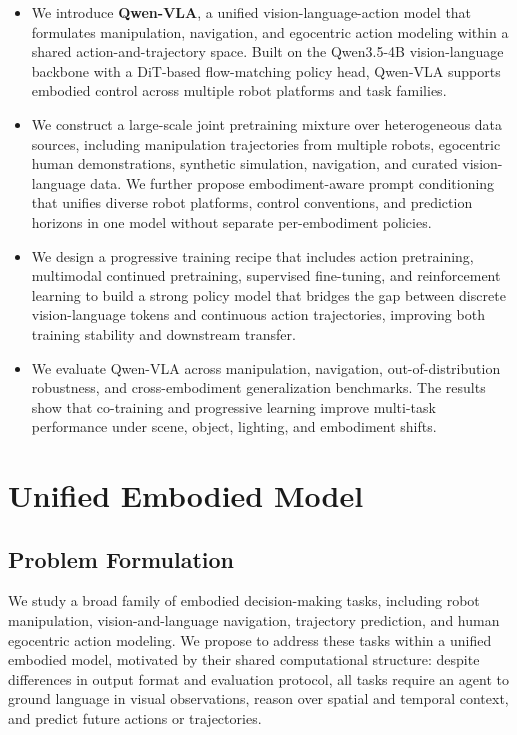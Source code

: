 \documentclass{article}
\begin{document}
\begin{itemize}
      \item We introduce \textbf{Qwen-VLA}, a unified vision-language-action model that formulates manipulation, navigation, and egocentric action modeling within a shared action-and-trajectory space. Built on the Qwen3.5-4B vision-language backbone with a DiT-based flow-matching policy head, Qwen-VLA supports embodied control across multiple robot platforms and task families.

      \item We construct a large-scale joint pretraining mixture over heterogeneous data sources, including manipulation trajectories from multiple robots, egocentric human demonstrations, synthetic simulation, navigation, and curated vision-language data. We further propose embodiment-aware prompt conditioning that unifies diverse robot platforms, control conventions, and prediction horizons in one model without separate per-embodiment policies.

      \item We design a progressive training recipe that includes action pretraining, multimodal continued pretraining, supervised fine-tuning, and reinforcement learning to build a strong policy model that bridges the gap between discrete vision-language tokens and continuous action trajectories, improving both training stability and downstream transfer.
      
      \item We evaluate Qwen-VLA across manipulation, navigation, out-of-distribution robustness, and cross-embodiment generalization benchmarks. The results show that co-training and progressive learning improve multi-task performance under scene, object, lighting, and embodiment shifts.
  \end{itemize}


\section{Unified Embodied Model}
\subsection{Problem Formulation}

We study a broad family of embodied decision-making tasks, including robot manipulation, vision-and-language navigation, trajectory prediction, and human egocentric action modeling. We propose to address these tasks within a unified embodied model, motivated by their shared computational structure: despite differences in output format and evaluation protocol, all tasks require  an agent to ground language in visual observations, reason over spatial and temporal context, and predict future actions or trajectories.
\end{document}
